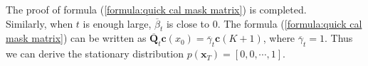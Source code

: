 \documentclass[lettersize,journal]{IEEEtran}
\begin{document}
The proof of formula (\ref{formula:quick cal mask matrix}) is completed.\\
Similarly, when $t$ is enough large, $\overline{\beta}_t$ is close to 0. The formula (\ref{formula:quick cal mask matrix}) can be written as $\overline{\boldsymbol{Q}}_t \boldsymbol{c}(x_0) =  \overline{\gamma}_t\boldsymbol{c}(K+1)$, where $\overline{\gamma}_t=1$. Thus we can derive the stationary distribution $p(\boldsymbol{x}_T)=[0, 0, \cdots, 1]$. 


 

\normalem
\balance

\end{document}
